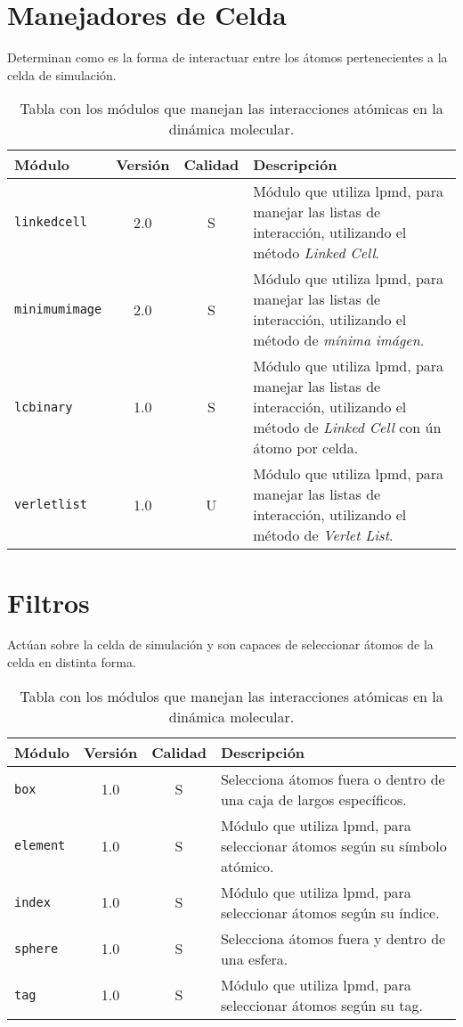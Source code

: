 \section{Manejadores de Celda}
Determinan como es la forma de interactuar entre los \'atomos pertenecientes a la celda de simulaci\'on.

\begin{table}[h!]
 \begin{tabular}{|l|c|c|p{10cm}|}\hline
 M\'odulo & Versi\'on & Calidad & Descripci\'on \\
 \hline\hline
 \texttt{linkedcell} & 2.0 & S & M\'odulo que utiliza lpmd, para manejar las listas de interacci\'on, utilizando el m\'etodo \textit{Linked Cell}.\\
 \hline
 \texttt{minimumimage} & 2.0 & S & M\'odulo que utiliza lpmd, para manejar las listas de interacci\'on, utilizando el m\'etodo de \textit{m\'inima im\'agen}.\\
 \hline
 \texttt{lcbinary} & 1.0 & S & M\'odulo que utiliza lpmd, para manejar las listas de interacci\'on, utilizando el m\'etodo de \textit{Linked Cell} con \'un \'atomo por celda.\\
 \hline
 \texttt{verletlist} & 1.0 & U & M\'odulo que utiliza lpmd, para manejar las listas de interacci\'on, utilizando el m\'etodo de \textit{Verlet List}.\\
 \hline
 \end{tabular}
\label{tab:modmanager}
\caption{Tabla con los m\'odulos que manejan las interacciones at\'omicas en la din\'amica molecular.}
\end{table}

\section{Filtros}
Act\'uan sobre la celda de simulaci\'on y son capaces de seleccionar \'atomos de la celda en distinta forma.

\begin{table}[h!]
 \begin{tabular}{|l|c|c|p{10cm}|}\hline
 M\'odulo & Versi\'on & Calidad & Descripci\'on \\
 \hline\hline
 \texttt{box} & 1.0 & S & Selecciona \'atomos fuera o dentro de una caja de largos espec\'ificos.\\
 \hline
 \texttt{element} & 1.0 & S & M\'odulo que utiliza lpmd, para seleccionar \'atomos seg\'un su s\'imbolo at\'omico.\\
 \hline
 \texttt{index} & 1.0 & S & M\'odulo que utiliza lpmd, para seleccionar \'atomos seg\'un su \'indice.\\
 \hline
 \texttt{sphere} & 1.0 & S & Selecciona \'atomos fuera y dentro de una esfera.\\
 \hline
 \texttt{tag} & 1.0 & S & M\'odulo que utiliza lpmd, para seleccionar \'atomos seg\'un su tag.\\
 \hline
 \end{tabular}
\label{tab:modmanager}
\caption{Tabla con los m\'odulos que manejan las interacciones at\'omicas en la din\'amica molecular.}
\end{table}


